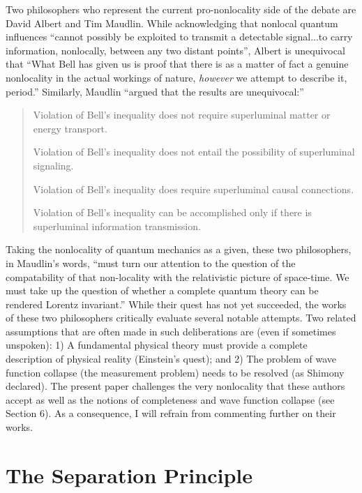 \documentclass[12pt]{article}
\begin{document}
Two philosophers who represent the current pro-nonlocality side of the debate are David Albert and Tim Maudlin.
While acknowledging that nonlocal quantum influences ``cannot possibly be exploited to transmit a detectable signal...to carry information, nonlocally, between any two distant points'', Albert \cite{Alb92} is unequivocal that ``What Bell has given us is proof that there is as a matter of fact a genuine nonlocality in the actual workings of nature, {\it however} we attempt to describe it, period.''  Similarly, Maudlin \cite{Mau11} ``argued that the results are unequivocal:''
\begin{quote}

Violation of Bell's inequality does not require superluminal matter or energy transport.

Violation of Bell's inequality does not entail the possibility of superluminal signaling.

Violation of Bell's inequality does require superluminal causal connections.

Violation of Bell's inequality can be accomplished only if there is superluminal information transmission.
\end{quote}

Taking the nonlocality of quantum mechanics as a given, these two philosophers, in Maudlin's words\cite{Mau11},  ``must turn our attention to the question of the compatability of that non-locality with the relativistic picture of space-time.  We must take up the question of whether a complete quantum theory can be rendered Lorentz invariant.''  While their quest has not yet succeeded, the works of these two philosophers critically evaluate several notable attempts.  Two related assumptions that are often made in such deliberations are (even if sometimes unspoken): 1) A fundamental physical theory must provide a complete description of physical reality (Einstein's quest); and 2) The problem of wave function collapse (the measurement problem) needs to be resolved (as Shimony declared).  The present paper challenges the very nonlocality that these authors accept as well as the notions of completeness and wave function collapse (see Section 6).  As a consequence, I will refrain from commenting further on their works.

\section{The Separation Principle}\label{SP}
\end{document}

